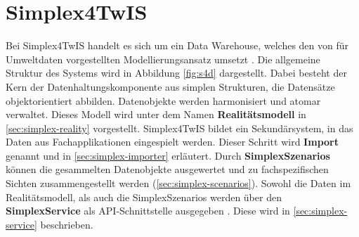 \section{Simplex4TwIS}
\label{sec:simplex}

Bei Simplex4TwIS handelt es sich um ein Data Warehouse, welches den von \textcite{rudolfUmweltdatenmanagementGeoInspiration2018} für Umweltdaten vorgestellten Modellierungsansatz umsetzt \parencite{grossmannFachsystemeSchemaevolution2024}. Die allgemeine Struktur des Systems wird in Abbildung \ref{fig:s4d} dargestellt. Dabei besteht der Kern der Datenhaltungskomponente aus simplen Strukturen, die Datensätze objektorientiert abbilden. Datenobjekte werden harmonisiert und atomar verwaltet. Dieses Modell wird unter dem Namen \textbf{Realitätsmodell} in \ref{sec:simplex-reality} vorgestellt. Simplex4TwIS bildet ein Sekundärsystem, in das Daten aus Fachapplikationen eingespielt werden. Dieser Schritt wird \textbf{Import} genannt und in \ref{sec:simplex-importer} erläutert. Durch \textbf{SimplexSzenarios} können die gesammelten Datenobjekte ausgewertet und zu fachspezifischen Sichten zusammengestellt werden (\ref{sec:simplex-scenarios}). Sowohl die Daten im Realitätsmodell, als auch die SimplexSzenarios werden über den \textbf{SimplexService} als \acs{API}-Schnittstelle ausgegeben \parencite{grossmannEnvVisioService2022}. Diese wird in \ref{sec:simplex-service} beschrieben.

